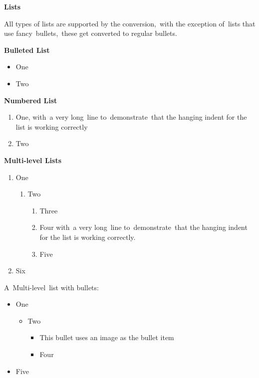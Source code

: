 \documentclass[\officeparserdriver aspectratio=169,12pt,xcolor=table]{beamer}
\begin{document}
\begin{frame}[allowframebreaks]
\relax
{\centering \textcolor{hex365F91}{\textbf{{\fontsize{14pt}{16.8pt}\selectfont Lists}}}\par}

\textcolor{hex365F91}{All types of lists are supported by the conversion,~with the exception of~lists that use fancy~bullets,~these get converted to regular bullets.}

\textcolor{hex4F81BD}{\textbf{{\fontsize{13pt}{15.6pt}\selectfont Bulleted List}}}

\begin{itemize}
\item \textcolor{hex000000}{One}
\item \textcolor{hex000000}{Two}
\end{itemize}

\textcolor{hex4F81BD}{\textbf{{\fontsize{13pt}{15.6pt}\selectfont Numbered List}}}

\begin{enumerate}
\item \textcolor{hex000000}{One, with~a very long~line to~demonstrate~that the hanging indent for the list is working correctly}
\item \textcolor{hex000000}{Two}
\end{enumerate}

\textcolor{hex4F81BD}{\textbf{{\fontsize{13pt}{15.6pt}\selectfont Multi-level Lists}}}

\begin{enumerate}
\item \textcolor{hex000000}{One}
\begin{enumerate}
\item \textcolor{hex000000}{Two}
\begin{enumerate}
\item \textcolor{hex000000}{Three}
\item \textcolor{hex000000}{Four with~a very long~line to~demonstrate~that the hanging indent for the list is working correctly.}
\item \textcolor{hex000000}{Five}
\end{enumerate}
\end{enumerate}
\item \textcolor{hex000000}{Six}
\end{enumerate}

\textcolor{hex000000}{A~Multi-level~list with bullets:}

\begin{itemize}
\item \textcolor{hex000000}{One}
\begin{itemize}
\item \textcolor{hex000000}{Two}
\begin{itemize}
\item \textcolor{hex000000}{This bullet uses an image as the bullet item}
\item \textcolor{hex000000}{Four}
\end{itemize}
\end{itemize}
\item \textcolor{hex000000}{Five}
\end{itemize}


\end{frame}
\end{document}
